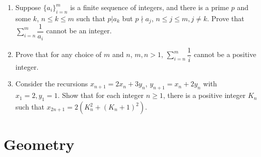 \documentclass[12pt]{article}
\begin{document}
\begin{enumerate}[resume]
    \item Suppose $\{a_{i}\}_{i=n}^{m}$ is a finite sequence of integers, and there is a prime $p$ and some $k$, $n\le k\le m$ such that $p|a_{k}$ but $p \nmid a_{j}$, $n\le j\le m, j\ne k$. Prove that $\sum_{i=n}^{m}\dfrac{1}{a_{i}}$ cannot be an integer.

    \item Prove that for any choice of $m$ and $n$, $m, n>1$, $\sum_{i=n}^{m}\dfrac{1}{i}$ cannot be a positive integer.

    \item Consider the recursions $x_{n+1}=2x_{n}+3y_{n}$, $y_{n+1}=x_{n}+2y_{n}$ with $x_{1}=2, y_{1}=1$. Show that for each integer $n\ge1$, there is a positive integer $K_{n}$ such that $x_{2n+1}=2(K_{n}^{2}+(K_{n}+1)^{2})$.
\end{enumerate}


\section*{Geometry}
\end{document}
